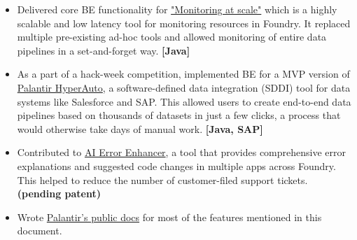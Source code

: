 \begin{itemize}
    \item {
        Delivered core BE functionality for
        \href{https://www.palantir.com/docs/foundry/maintaining-pipelines/monitoring-views-intro/}{"Monitoring at scale"}
        which is a highly scalable and low latency tool for monitoring resources in Foundry.
        It replaced multiple pre-existing ad-hoc tools and allowed monitoring of entire data pipelines in a set-and-forget way.
    }
    \textbf{[Java]}
    \item {
        As a part of a hack-week competition, implemented BE for a MVP version of
        \href{https://www.palantir.com/docs/foundry/hyperauto/overview/}{Palantir HyperAuto},
        a software-defined data integration (SDDI) tool for data systems like Salesforce and SAP.
        This allowed users to create end-to-end data pipelines based on thousands of datasets
        in just a few clicks, a process that would otherwise take days of manual work.
    }
    \textbf{[Java, SAP]}
    \item {
        Contributed to
        \href{https://www.palantir.com/docs/foundry/code-repositories/aip-features/#ai-error-enhancer}{AI Error Enhancer},
        a tool that provides comprehensive error explanations and suggested code changes in multiple apps across Foundry.
        This helped to reduce the number of customer-filed support tickets.
    }
    \textbf{(pending patent)}
    \item {
        Wrote
        \href{https://www.palantir.com/docs/foundry/}{Palantir's public docs}
        for most of the features mentioned in this document.
    }
\end{itemize}
